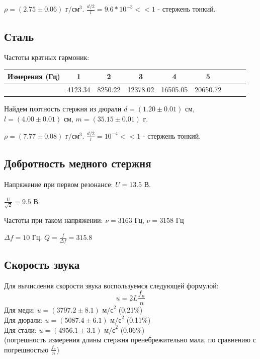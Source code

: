 \documentclass[a4, 12pt]{article}
\begin{document}
	$\rho = (2.75\pm0.06)$ г/см$^3$.
 $\frac{d / 2}{l} = 9.6 * 10^{-3} << 1$ - стержень тонкий.
 
	
	\subsection{Сталь}
	Частоты кратных гармоник: 
	\begin{center}
		\begin{tabular}{|c||c|c|c|c|c|c|c|c|}
			\hline
			Измерения (Гц) & 1 & 2 & 3 & 4 & 5\\
			\hline
			& 4123.34 & 8250.22 & 12378.02 & 16505.05 & 20650.72 \\
			\hline
		\end{tabular}
	\end{center}
	
	Найдем плотность стержня из дюрали $d = (1.20 \pm 0.01) \text{ см}$, $l = (4.00 \pm 0.01) \text{ см}$, $m = (35.15 \pm 0.01) \text{ г}$.
	
	$\rho = (7.77 \pm 0.08)$ г/см$^3$.
 $\frac{d / 2}{l} = 10^{-4} << 1$ - стержень тонкий.
 \subsection{Добротность медного стержня}
	Напряжение при первом резонансе: $U = 13.5$ В.
	
	$\frac{U}{\sqrt{2}} = 9.5$ В.
	
	Частоты при таком напряжении: $\nu = 3163 \text{ Гц}$, $\nu = 3158 \text{ Гц}$
	
	$\Delta f = 10$ Гц.
	$Q = \frac{f}{\Delta f} = 315.8$
 \subsection{Скорость звука}
    Для вычисления скорости звука воспользуемся следующей формулой:
    \begin{equation}
		u = 2L\frac{f_n}{n}
		\label{sound spped}
	\end{equation}
	Для меди: $u = (3797.2 \pm 8.1)\text{ м/с}^2$ (0.21\%) \\
	Для дюрали: $u = (5087.4 \pm 6.1)\text{ м/с}^2$ (0.11\%) \\
	Для стали: $u = (4956.1 \pm 3.1)\text{ м/с}^2$ (0.06\%) \\
	(погрешность измерения длины стержня пренебрежительно мала, по сравнению с погрешностью $\frac{f_n}{n}$)
	
\end{document}
